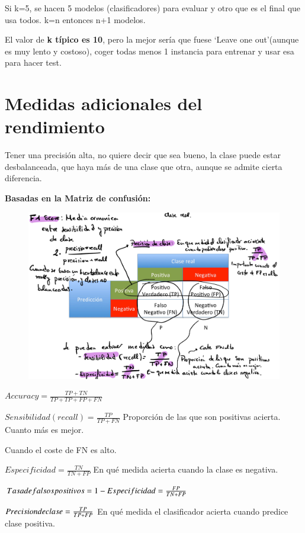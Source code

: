 \documentclass[12pt]{report} %
\begin{document}
Si k=5, se hacen 5 modelos (clasificadores) para evaluar y otro que es
el final que usa todos. k=n entonces n+1 modelos.

El valor de \textbf{k típico es 10}, pero la mejor sería que fuese
`Leave one out'(aunque es muy lento y costoso), coger todas menos 1
instancia para entrenar y usar esa para hacer test.

\section{Medidas adicionales del
rendimiento}

Tener una precisión alta, no quiere decir que sea bueno, la clase puede
estar desbalanceada, que haya más de una clase que otra, aunque se
admite cierta diferencia.

\textbf{Basadas en la Matriz de confusión:}

\begin{figure}[H]
	{\includegraphics[scale=.2]{Untitled 11.png}}
\end{figure}

\(Accuracy= \frac {TP+TN}{TP+TP+FP+FN}\)

\(Sensibilidad(recall)= \frac {TP}{TP+FN}\) Proporción de las que son
positivas acierta. Cuanto más es mejor.

Cuando el coste de FN es alto.

\(Especificidad= \frac {TN}{TN+FP}\) En qué medida acierta cuando la
clase es negativa.

\(Tasa \space de\space falsos \space positivos=1-Especificidad= \frac {FP}{TN+FP}\)

\(Precision \space de \space clase= \frac {TP}{TP+FP}\) En qué medida el
clasificador acierta cuando predice clase positiva.
\end{document}
